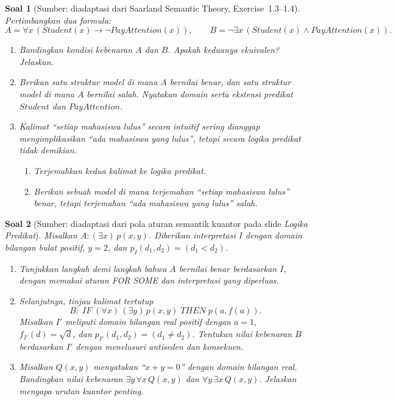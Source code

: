 \documentclass[12pt,a4paper]{article}
\theoremstyle{soaljarak}
\newtheorem{soal}{Soal}
\begin{document}
\begin{soal}[\normalfont Sumber: diadaptasi dari Saarland Semantic Theory, Exercise~1.3--1.4]
  Pertimbangkan dua formula:
  \[
  A = \forall x\,(\mathit{Student}(x) \rightarrow \neg\mathit{PayAttention}(x)),
  \qquad
  B = \neg\exists x\,(\mathit{Student}(x) \wedge \mathit{PayAttention}(x)).
  \]
  \begin{enumerate}
    \item Bandingkan kondisi kebenaran \(A\) dan \(B\).
          Apakah keduanya ekuivalen?
          Jelaskan.
    \item Berikan satu struktur model di mana \(A\) bernilai benar, dan satu struktur model di mana \(A\) bernilai salah.
          Nyatakan domain serta ekstensi predikat \(\mathit{Student}\) dan \(\mathit{PayAttention}\).
    \item Kalimat ``setiap mahasiswa lulus'' secara intuitif sering dianggap mengimplikasikan ``ada mahasiswa yang lulus'', tetapi secara logika predikat tidak demikian.
          \begin{enumerate}
            \item Terjemahkan kedua kalimat ke logika predikat.
            \item Berikan sebuah model di mana terjemahan ``setiap mahasiswa lulus'' benar, tetapi terjemahan ``ada mahasiswa yang lulus'' salah.
          \end{enumerate}
  \end{enumerate}
\end{soal}

\begin{soal}[\normalfont Sumber: diadaptasi dari pola aturan semantik kuantor pada slide \textit{Logika Predikat}]
  Misalkan \(A : (\exists x)\,p(x,y)\).
  Diberikan interpretasi \(I\) dengan domain bilangan bulat positif,
  \(y = 2\), dan \(p_I(d_1,d_2) = (d_1 < d_2)\).
  \begin{enumerate}
    \item Tunjukkan langkah demi langkah bahwa \(A\) bernilai benar berdasarkan \(I\),
          dengan memakai aturan FOR SOME dan interpretasi yang diperluas.
    \item Selanjutnya, tinjau kalimat tertutup
          \[
          B :\;
          \mathit{IF}\; (\forall x)\,(\exists y)\,p(x,y)\;
          \mathit{THEN}\; p(a,f(a)).
          \]
          Misalkan \(I'\) meliputi domain bilangan real positif dengan
          \(a = 1\), \(f_{I'}(d) = \sqrt{d}\), dan \(p_{I'}(d_1,d_2) = (d_1 \neq d_2)\).
          Tentukan nilai kebenaran \(B\) berdasarkan \(I'\) dengan menelusuri antiseden dan konsekuen.
    \item Misalkan \(Q(x,y)\) menyatakan ``\(x + y = 0\)'' dengan domain bilangan real.
          Bandingkan nilai kebenaran \(\exists y\,\forall x\,Q(x,y)\) dan \(\forall y\,\exists x\,Q(x,y)\).
          Jelaskan mengapa urutan kuantor penting.
  \end{enumerate}
\end{soal}
\end{document}
